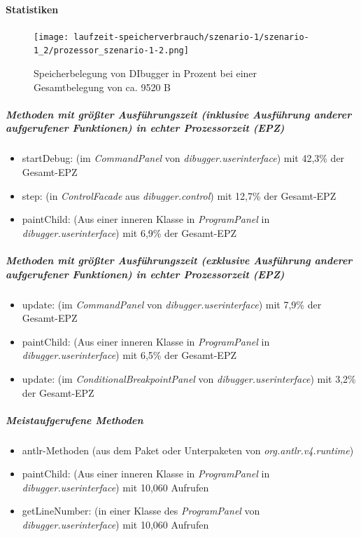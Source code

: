 \documentclass[parskip=full]{scrartcl}
\begin{document}
        \paragraph{Statistiken}
        \begin{figure}[!h]
            \centering
            \texttt{[image: laufzeit-speicherverbrauch/szenario-1/szenario-1\_2/prozessor\_szenario-1-2.png]}
            \caption{Speicherbelegung von DIbugger in Prozent bei einer Gesamtbelegung von ca. 9520 B}
        \end{figure}
        \subparagraph{Methoden mit größter Ausführungszeit (inklusive Ausführung anderer aufgerufener Funktionen) in echter Prozessorzeit (EPZ)}
        \begin{itemize}
            \item{startDebug}: (im \textit{CommandPanel} von \textit{dibugger.userinterface}) mit 42,3\% der Gesamt-EPZ
            \item{step}: (in \textit{ControlFacade} aus \textit{dibugger.control}) mit 12,7\% der Gesamt-EPZ
            \item{paintChild}: (Aus einer inneren Klasse in \textit{ProgramPanel} in \textit{dibugger.userinterface}) mit 6,9\% der Gesamt-EPZ
        \end{itemize}
        \subparagraph{Methoden mit größter Ausführungszeit (exklusive Ausführung anderer aufgerufener Funktionen) in echter Prozessorzeit (EPZ)}
        \begin{itemize}
            \item{update}: (im \textit{CommandPanel} von \textit{dibugger.userinterface}) mit 7,9\% der Gesamt-EPZ 
            \item{paintChild}: (Aus einer inneren Klasse in \textit{ProgramPanel} in \textit{dibugger.userinterface}) mit 6,5\% der Gesamt-EPZ
            \item{update}: (im \textit{ConditionalBreakpointPanel} von \textit{dibugger.userinterface}) mit 3,2\% der Gesamt-EPZ 
        \end{itemize}
        \subparagraph{Meistaufgerufene Methoden}
        \begin{itemize}
            \item{antlr-Methoden} (aus dem Paket oder Unterpaketen von \textit{org.antlr.v4.runtime}) 
            \item{paintChild}: (Aus einer inneren Klasse in \textit{ProgramPanel} in \textit{dibugger.userinterface}) mit 10,060 Aufrufen
            \item{getLineNumber}: (in einer Klasse des \textit{ProgramPanel} von \textit{dibugger.userinterface}) mit 10,060 Aufrufen
        \end{itemize}
\end{document}
